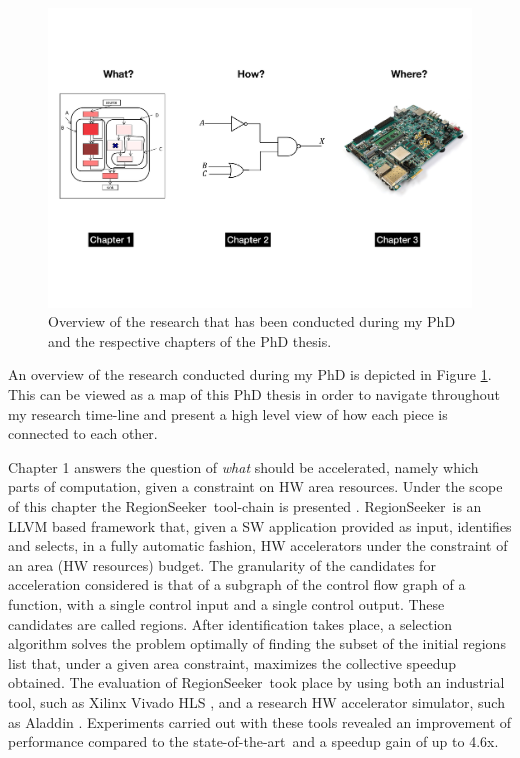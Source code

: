 \documentclass[]{usiinfthesis}
\newcommand{\rseeker}{{RegionSeeker}}
\newcommand{\SoTA}{{state-of-the-art}}
\begin{document}
\begin{figure}[t]
\centering
\includegraphics[width= 1 \linewidth]{figs/Research_Carol}
\caption{Overview of the research that has been conducted during my PhD and the respective chapters
of the PhD thesis.}
\label{fig:overview}
\end{figure}

An overview of the research conducted during my PhD is depicted in Figure \ref{fig:overview}.
This can be viewed as a map of this PhD thesis in order to navigate throughout my 
research time-line and present a high level view of how each piece is connected to each other.\par

Chapter 1 answers the question of {\em what} should be accelerated, namely which parts of 
computation, given a constraint on HW area resources. 
Under the scope of this chapter the \rseeker\ tool-chain is presented \cite{ZacharopoulosApr19}. 
\rseeker\ is an LLVM based framework 
that, given a SW application provided as input, identifies and selects, in a fully automatic fashion, HW 
accelerators under the constraint of an area (HW resources) budget. The granularity of the candidates for 
acceleration considered is that of a subgraph of the control flow graph of a function, with a single control 
input and a single control output. These candidates are called regions. After identification takes place, a selection algorithm solves the problem optimally of 
finding the subset of the initial regions list that, under a given area constraint, maximizes the collective 
speedup obtained. The evaluation of \rseeker\ took place by using both an industrial tool, such as Xilinx
Vivado HLS \cite{VivadoHLSMar17}, and a research HW accelerator simulator, such as Aladdin \cite{ShaoJul14}. 
Experiments carried out with these tools revealed an improvement of performance compared to the \SoTA\
and a speedup gain of up to 4.6x. 
\par
\end{document}
